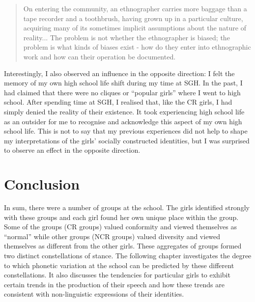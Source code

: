 \begin{quote}
	On entering the community, an ethnographer carries more baggage than a tape recorder and a toothbrush, having grown up in a particular culture, acquiring many of its sometimes implicit assumptions about the nature of reality... The problem is not whether the ethnographer is biased; the problem is what kinds of biases exist - how do they enter into ethnographic work and how can their operation be documented. \citep[41-2]{agar1980}
\end{quote}

\noindent Interestingly, I also observed an influence in the opposite direction: I felt the memory of my own high school life shift during my time at SGH. In the past, I had claimed that there were no cliques or ``popular girls'' where I went to high school. After spending time at SGH, I realised that, like the CR girls, I had simply denied the reality of their existence. It took experiencing high school life as an outsider for me to recognise and acknowledge this aspect of my own high school life. This is not to say that my previous experiences did not help to shape my interpretations of the girls' socially constructed identities, but I was surprised to observe an effect in the opposite direction.

\section{Conclusion}

In sum, there were a number of groups at the school. The girls identified strongly with these groups and each girl found her own unique place within the group. Some of the groups (CR groups) valued conformity and viewed themselves as ``normal'' while other groups (NCR groups) valued diversity and viewed themselves as different from the other girls. These aggregates of groups formed two distinct constellations of stance. The following chapter investigates the degree to which phonetic variation at the school can be predicted by these different constellations. It also discusses the tendencies for particular girls to exhibit certain trends in the production of their speech and how these trends are consistent with non-linguistic expressions of their identities.


\newpage
\thispagestyle{empty}
\mbox{}
